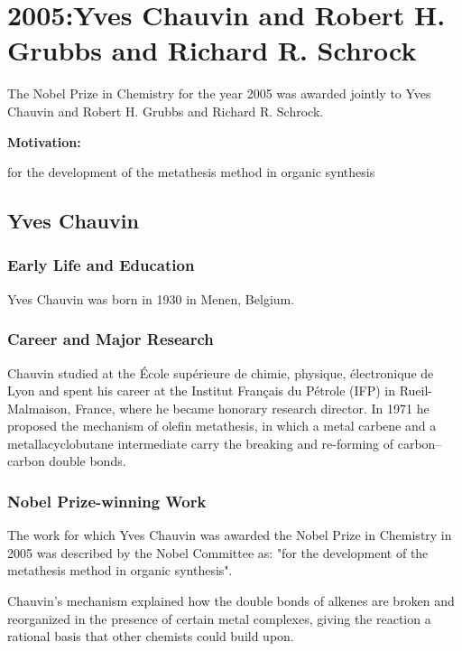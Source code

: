\chapter{2005:Yves Chauvin and Robert H. Grubbs and Richard R. Schrock}

\label{chap:chemistry2005}

The Nobel Prize in Chemistry for the year 2005 was awarded jointly to Yves Chauvin and Robert H. Grubbs and Richard R. Schrock.

\textbf{Motivation:}

for the development of the metathesis method in organic synthesis

\section{Yves Chauvin}

\subsection*{Early Life and Education}

Yves Chauvin was born in 1930 in Menen, Belgium.

\subsection*{Career and Major Research}

Chauvin studied at the École supérieure de chimie, physique, électronique de Lyon and spent his career at the Institut Français du Pétrole (IFP) in Rueil-Malmaison, France, where he became honorary research director. In 1971 he proposed the mechanism of olefin metathesis, in which a metal carbene and a metallacyclobutane intermediate carry the breaking and re-forming of carbon--carbon double bonds.

\subsection*{Nobel Prize-winning Work}

The work for which Yves Chauvin was awarded the Nobel Prize in Chemistry in 2005 was described by the Nobel Committee as: "for the development of the metathesis method in organic synthesis".

Chauvin's mechanism explained how the double bonds of alkenes are broken and reorganized in the presence of certain metal complexes, giving the reaction a rational basis that other chemists could build upon.

